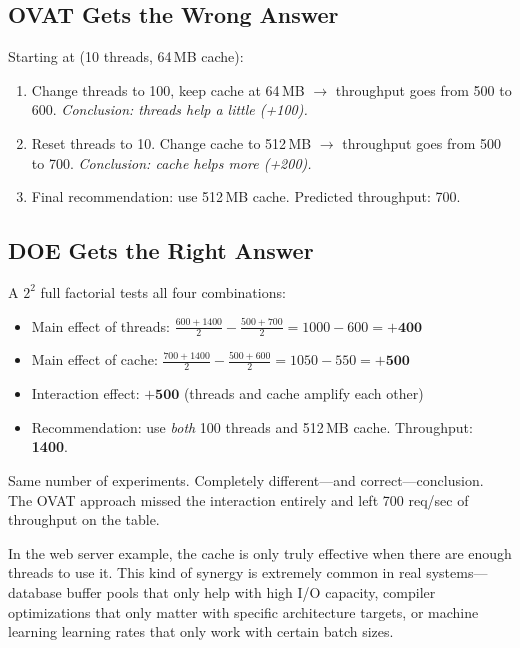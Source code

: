 \documentclass[11pt]{book}
\begin{document}
\subsection{OVAT Gets the Wrong Answer}

Starting at (10 threads, 64\,MB cache):
\begin{enumerate}[nosep]
\item Change threads to 100, keep cache at 64\,MB $\to$ throughput goes from
      500 to 600. \emph{Conclusion: threads help a little (+100).}
\item Reset threads to 10. Change cache to 512\,MB $\to$ throughput goes from
      500 to 700. \emph{Conclusion: cache helps more (+200).}
\item Final recommendation: use 512\,MB cache. Predicted throughput: 700.
\end{enumerate}

\subsection{DOE Gets the Right Answer}

A $2^2$ full factorial tests all four combinations:
\begin{itemize}[nosep]
\item Main effect of threads: $\frac{600 + 1400}{2} - \frac{500 + 700}{2}
      = 1000 - 600 = \mathbf{+400}$
\item Main effect of cache: $\frac{700 + 1400}{2} - \frac{500 + 600}{2}
      = 1050 - 550 = \mathbf{+500}$
\item Interaction effect: $\mathbf{+500}$ (threads and cache amplify each other)
\item Recommendation: use \emph{both} 100 threads and 512\,MB cache.
      Throughput: \textbf{1400}.
\end{itemize}

Same number of experiments. Completely different---and correct---conclusion.
The OVAT approach missed the interaction entirely and left 700 req/sec of
throughput on the table.

\begin{warning}
In the web server example, the cache is only truly effective when there are
enough threads to use it. This kind of synergy is extremely common in real
systems---database buffer pools that only help with high I/O capacity, compiler
optimizations that only matter with specific architecture targets, or machine
learning learning rates that only work with certain batch sizes.
\end{warning}
\end{document}
